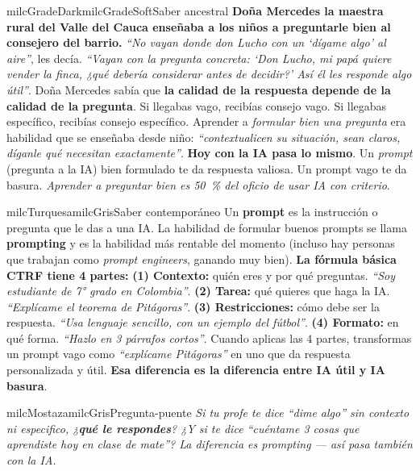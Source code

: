 \documentclass[11pt,letterpaper]{article}
\begin{document}
\begin{softbox}{milcGradeDark}{milcGradeSoft}{Saber ancestral}
\textbf{Doña Mercedes la maestra rural del Valle del Cauca enseñaba a los niños a preguntarle bien al consejero del barrio.} \emph{``No vayan donde don Lucho con un `dígame algo' al aire''}, les decía. \emph{``Vayan con la pregunta concreta: `Don Lucho, mi papá quiere vender la finca, ¿qué debería considerar antes de decidir?' Así él les responde algo útil''}. Doña Mercedes sabía que \textbf{la calidad de la respuesta depende de la calidad de la pregunta}. Si llegabas vago, recibías consejo vago. Si llegabas específico, recibías consejo específico. Aprender a \emph{formular bien una pregunta} era habilidad que se enseñaba desde niño: \emph{``contextualicen su situación, sean claros, díganle qué necesitan exactamente''}. \textbf{Hoy con la IA pasa lo mismo}. Un \emph{prompt} (pregunta a la IA) bien formulado te da respuesta valiosa. Un prompt vago te da basura. \emph{Aprender a preguntar bien es 50~\% del oficio de usar IA con criterio}.
\end{softbox}

\begin{softbox}{milcTurquesa}{milcGris}{Saber contemporáneo}
Un \textbf{prompt} es la instrucción o pregunta que le das a una IA. La habilidad de formular buenos prompts se llama \textbf{prompting} y es la habilidad más rentable del momento (incluso hay personas que trabajan como \emph{prompt engineers}, ganando muy bien). \textbf{La fórmula básica CTRF tiene 4 partes:} \textbf{(1) Contexto:} quién eres y por qué preguntas. \emph{``Soy estudiante de 7° grado en Colombia''}. \textbf{(2) Tarea:} qué quieres que haga la IA. \emph{``Explícame el teorema de Pitágoras''}. \textbf{(3) Restricciones:} cómo debe ser la respuesta. \emph{``Usa lenguaje sencillo, con un ejemplo del fútbol''}. \textbf{(4) Formato:} en qué forma. \emph{``Hazlo en 3 párrafos cortos''}. Cuando aplicas las 4 partes, transformas un prompt vago como \emph{``explícame Pitágoras''} en uno que da respuesta personalizada y útil. \textbf{Esa diferencia es la diferencia entre IA útil y IA basura}.
\end{softbox}

\begin{softbox}{milcMostaza}{milcGris}{Pregunta-puente}
\textit{Si tu profe te dice \emph{``dime algo''} sin contexto ni especifico, ¿\textbf{qué le respondes}? ¿Y si te dice \emph{``cuéntame 3 cosas que aprendiste hoy en clase de mate''}? La diferencia es prompting --- así pasa también con la IA.}
\end{softbox}
\end{document}
